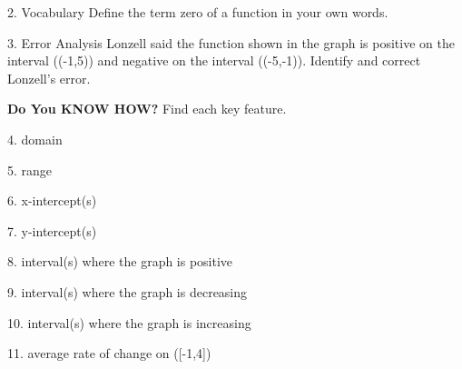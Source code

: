 \documentclass{article}
\newenvironment{concept-summary}{}{}    %
\newcommand{\answer}[1]{}               %
\newcommand{\placeholder}[2]{}          %
\newcommand{\te}[1]{}                   %
\begin{document}
\begin{concept-summary}
2. Vocabulary Define the term zero of a function in your own words.
\answer{The zeros of a function are the input values that result in a function output value of 0.}
3. Error Analysis Lonzell said the function shown in the graph is positive on the interval ((-1,5)) and negative on the interval ((-5,-1)). Identify and correct Lonzell’s error.
\placeholder{graph}{Exercise 3: red V-shaped function with vertex (-1,-3), x-intercepts -4 and 2, and y-intercept -2. Square unit grid approximately x=-6 to 6 and y=-4 to 4. Axes x/y with arrows, origin O, x labels -4, -2, 2, 4 and y labels -2, 2, 4. Red arrowheads at upper left and upper right curve ends. No point circles.}
\answer{Lonzell confused positive with increasing and negative with decreasing. The function is positive on the intervals ((-\infty,-4)) and ((2,\infty)) and negative on the interval ((-4,2)).}
\textbf{Do You KNOW HOW?}
Find each key feature.
\placeholder{graph}{Exercises 4–11 share a red polyline with open circle (-4,1), vertex (-2,-1), vertex (2,3), and filled endpoint (4,0), joined by straight segments. Intercepts at (-3,0), (-1,0), (4,0), and (0,1). Unit square grid approximately x=-5 to 4 and y=-2 to 4; x/y axes arrowed, origin O; x labels -4, 2, 4 and y label 2. No curve arrowheads.}
4. domain
\answer{((-4,4])}
5. range
\answer{([-1,3])}
6. x-intercept(s)
\answer{(x=-3), (x=-1), (x=4)}
7. y-intercept(s)
\answer{(y=1)}
8. interval(s) where the graph is positive
\answer{((-4,-3)) and ((-1,4))}
9. interval(s) where the graph is decreasing
\answer{((-4,-2)) and ((2,4])}
10. interval(s) where the graph is increasing
\answer{((-2,2))}
11. average rate of change on ([-1,4])
\answer{0}
\te{Concept Summary, Do You Understand, and Do You Know How are available at SavvasRealize.com.}
\end{concept-summary}
\end{document}
